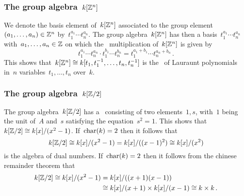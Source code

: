 \subsection{}



\subsubsection{The group algebra~$k[\mathbb{Z}^n]$}

We denote the basis element of~$k[\mathbb{Z}^n]$ associated to the group element~$(a_1, \dotsc, a_n) \in \mathbb{Z}^n$ by~$t_1^{a_1} \dotsm t_n^{a_n}$.
The group algebra~$k[\mathbb{Z}^n]$ has then a basis~$t_1^{a_1} \dotsm t_n^{a_n}$ with~$a_1, \dotsc, a_n \in \mathbb{Z}$ on which the~{\kbil} multiplication of~$k[\mathbb{Z}^n]$ is given by
\[
        t_1^{a_1} \dotsm t_n^{a_n}
  \cdot t_1^{b_1} \dotsm t_n^{b_n}
  =     t_1^{a_1 + b_1} \dotsm t_n^{a_n + b_n} \,.
\]
This shows that~$k[\mathbb{Z}^n] \cong k[t_1, t_1^{-1}, \dotsc, t_n, t_n^{-1}]$ is the~{\kalg} of Lauraunt polynomials in~$n$ variables~$t_1, \dotsc, t_n$ over~$k$.



\subsubsection{The group algebra~$k[\mathbb{Z}/2]$}

The group algebra~$k[\mathbb{Z}/2]$ has a~{\kbasis} consisting of two elements~$1, s$, with~$1$ being the unit of~$A$ and~$s$ satisfying the equation~$s^2 = 1$.
This shows that~$k[\mathbb{Z}/2] \cong k[x]/(x^2 - 1)$.
If~$\operatorname{char}(k) = 2$ then it follows that
\[
        k[\mathbb{Z}/2]
  \cong k[x]/(x^2 - 1)
  =     k[x]/((x-1)^2)
  \cong k[x]/(x^2)
\]
is the algebra of dual numbers.
If~$\operatorname{char}(k) = 2$ then it follows from the chinese remainder theorem that
\begin{align*}
          k[\mathbb{Z}/2]
   \cong  k[x]/(x^2 - 1)
  &=      k[x]/((x+1)(x-1)) \\
  &\cong  k[x]/(x+1) \times k[x]/(x-1)
   \cong  k \times k \,.
\end{align*}


